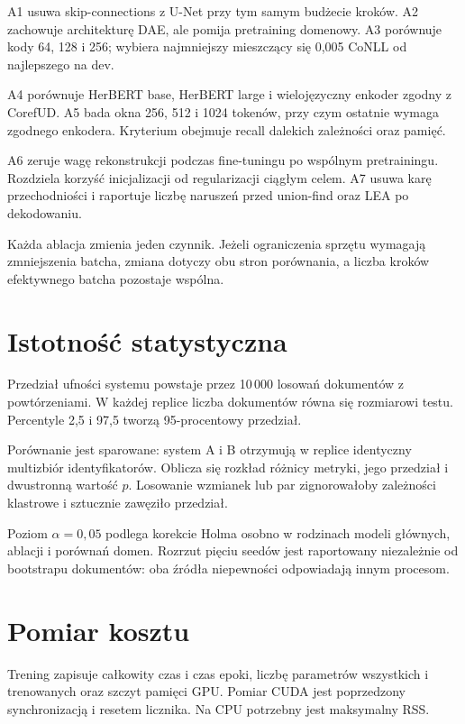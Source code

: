 A1 usuwa skip-connections z U-Net przy tym samym budżecie kroków. A2 zachowuje architekturę DAE, ale pomija pretraining domenowy. A3 porównuje kody 64, 128 i 256; wybiera najmniejszy mieszczący się 0,005 CoNLL od najlepszego na dev.

A4 porównuje HerBERT base, HerBERT large i wielojęzyczny enkoder zgodny z CorefUD. A5 bada okna 256, 512 i 1024 tokenów, przy czym ostatnie wymaga zgodnego enkodera. Kryterium obejmuje recall dalekich zależności oraz pamięć.

A6 zeruje wagę rekonstrukcji podczas fine-tuningu po wspólnym pretrainingu. Rozdziela korzyść inicjalizacji od regularizacji ciągłym celem. A7 usuwa karę przechodniości i raportuje liczbę naruszeń przed union-find oraz LEA po dekodowaniu.

Każda ablacja zmienia jeden czynnik. Jeżeli ograniczenia sprzętu wymagają zmniejszenia batcha, zmiana dotyczy obu stron porównania, a liczba kroków efektywnego batcha pozostaje wspólna.

\section{Istotność statystyczna}
\label{sec:istotnosc}

Przedział ufności systemu powstaje przez 10\,000 losowań dokumentów z powtórzeniami. W każdej replice liczba dokumentów równa się rozmiarowi testu. Percentyle 2,5 i 97,5 tworzą 95-procentowy przedział.

Porównanie jest sparowane: system A i B otrzymują w replice identyczny multizbiór identyfikatorów. Oblicza się rozkład różnicy metryki, jego przedział i dwustronną wartość $p$. Losowanie wzmianek lub par zignorowałoby zależności klastrowe i sztucznie zawęziło przedział.

Poziom $\alpha=0{,}05$ podlega korekcie Holma osobno w rodzinach modeli głównych, ablacji i porównań domen. Rozrzut pięciu seedów jest raportowany niezależnie od bootstrapu dokumentów: oba źródła niepewności odpowiadają innym procesom.

\section{Pomiar kosztu}
\label{sec:koszt}

Trening zapisuje całkowity czas i czas epoki, liczbę parametrów wszystkich i trenowanych oraz szczyt pamięci GPU. Pomiar CUDA jest poprzedzony synchronizacją i resetem licznika. Na CPU potrzebny jest maksymalny RSS.


